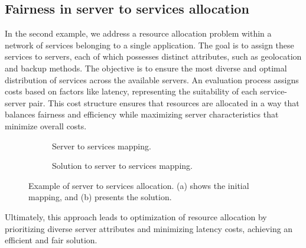         \subsection{Fairness in server to services allocation}
        
        In the second example, we address a resource allocation problem within a network of services belonging to a single application. The goal is to assign these services to servers, each of which possesses distinct attributes, such as geolocation and backup methods. The objective is to ensure the most diverse and optimal distribution of services across the available servers. An evaluation process assigns costs based on factors like latency, representing the suitability of each service-server pair. This cost structure ensures that resources are allocated in a way that balances fairness and efficiency while maximizing server characteristics that minimize overall costs.

        \begin{figure}[]
            \centering
            \begin{subfigure}[t]{0.8\textwidth}
            \centering
            
            \caption{Server to services mapping.}
            \label{fig:server_services_unsolved}
            \end{subfigure}
            \vspace{1em}
            \begin{subfigure}[t]{0.8\textwidth}
            \centering
            
            \caption{Solution to server to services mapping.}
            \label{fig:server_services_solved}
            \end{subfigure}
            \caption{Example of server to services allocation. (a) shows the initial mapping, and (b) presents the solution.}
            \label{fig:server_services_example}
        \end{figure}
        
        Ultimately, this approach leads to optimization of resource allocation by prioritizing diverse server attributes and minimizing latency costs, achieving an efficient and fair solution.

